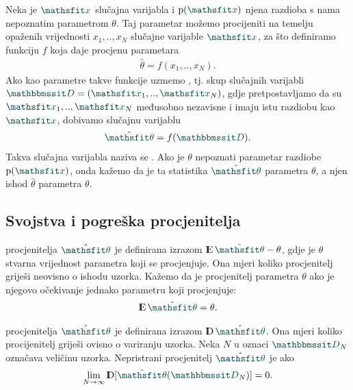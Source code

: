 \documentclass[utf8, diplomski, lmodern]{fer}
\begin{document}
Neka je $\rvar x$ slučajna varijabla i $\p(\rvar x)$ njena razdioba s nama nepoznatim parametrom $\theta$. Taj parametar možemo procijeniti na temelju opaženih vrijednosti $x_1,..,x_N$ slučajne varijable $\rvar x$, za što definiramo funkciju $f$ koja daje procjenu parametara
\begin{align}
\hat{\theta}=f(x_1,..,x_N) \text{.}
\end{align}
Ako kao parametre takve funkcije uzmemo , tj. skup slučajnih varijabli $\rset D=\del{\rvar x_1,..,\rvar x_N}$, gdje pretpostavljamo da su $\rvar x_1,..,\rvar x_N$ međusobno nezavisne i imaju istu razdiobu kao $\rvar x$, dobivamo slučajnu varijablu
\begin{align}
\hat{\rvar\theta}=f(\rset D) \text{.}
\end{align}
Takva slučajna varijabla naziva se . Ako je $\theta$ nepoznati parametar razdiobe $\p(\rvar x)$, onda kažemo da je ta statistika $\hat{\rvar\theta}$  parametra $\theta$, a njen ishod $\hat{\theta}$  parametra $\theta$.

\subsection{Svojstva i pogreška procjenitelja}

 procjenitelja $\hat{\rvar\theta}$ je definirana izrazom $\E\hat{\rvar\theta} - \theta$, gdje je $\theta$ stvarna vrijednost parametra koji se procjenjuje. Ona mjeri koliko procjenitelj griješi neovisno o ishodu uzorka. Kažemo da je procjenitelj parametra $\theta$  ako je njegovo očekivanje jednako parametru koji procjenjuje:
\begin{align}
\E\hat{\rvar\theta} = \theta \text{.}
\end{align}

 procjenitelja $\hat{\rvar\theta}$ je definirana izrazom $\D\hat{\rvar\theta}$. Ona mjeri koliko procijenitelj griješi ovisno o variranju uzorka. 
Neka $N$ u oznaci ${\rset D}_N$ označava veličinu uzorka. Nepristrani procjenitelj $\hat{\rvar\theta}$ je  ako 
\begin{align}
\lim_{N\to\infty} \D\sbr{\hat{\rvar\theta}(\rset D_N)} = 0  \text{.}
\end{align}
\end{document}
